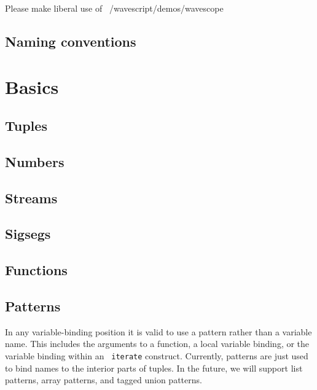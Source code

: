 Please make liberal use of ~/wavescript/demos/wavescope

\section{Naming conventions}


\chapter{Basics}

\section{Tuples}

\section{Numbers}



\section{Streams}

\section{Sigsegs}

\section{Functions}

\section{Patterns}

In any variable-binding position it is valid to use a pattern rather
than a variable name.  This includes the arguments to a function, a
local variable binding, or the variable binding within an {\tt
  iterate} construct.  Currently, patterns are just used to bind names
to the interior parts of tuples.  In the future, we will support list
patterns, array patterns, and tagged union patterns.  

